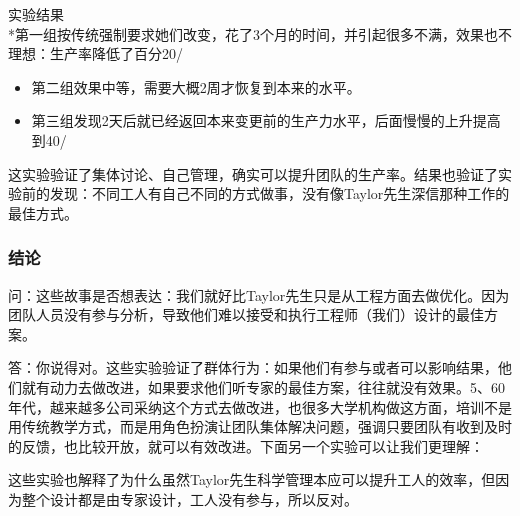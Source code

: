 实验结果\\
*第一组按传统强制要求她们改变，花了3个月的时间，并引起很多不满，效果也不理想：生产率降低了百分20/%

\begin{itemize}
\tightlist
\item
  第二组效果中等，需要大概2周才恢复到本来的水平。
\item
  第三组发现2天后就已经返回本来变更前的生产力水平，后面慢慢的上升提高到40/%
\end{itemize}

这实验验证了集体讨论、自己管理，确实可以提升团队的生产率。结果也验证了实验前的发现：不同工人有自己不同的方式做事，没有像Taylor先生深信那种工作的最佳方式。\\

\hypertarget{ux7ed3ux8bba}{%
\subsubsection{结论}\label{ux7ed3ux8bba}}

问：这些故事是否想表达：我们就好比Taylor先生只是从工程方面去做优化。因为团队人员没有参与分析，导致他们难以接受和执行工程师（我们）设计的最佳方案。

答：你说得对。这些实验验证了群体行为：如果他们有参与或者可以影响结果，他们就有动力去做改进，如果要求他们听专家的最佳方案，往往就没有效果。5、60年代，越来越多公司采纳这个方式去做改进，也很多大学机构做这方面，培训不是用传统教学方式，而是用角色扮演让团队集体解决问题，强调只要团队有收到及时的反馈，也比较开放，就可以有效改进。下面另一个实验可以让我们更理解：


这些实验也解释了为什么虽然Taylor先生科学管理本应可以提升工人的效率，但因为整个设计都是由专家设计，工人没有参与，所以反对。

